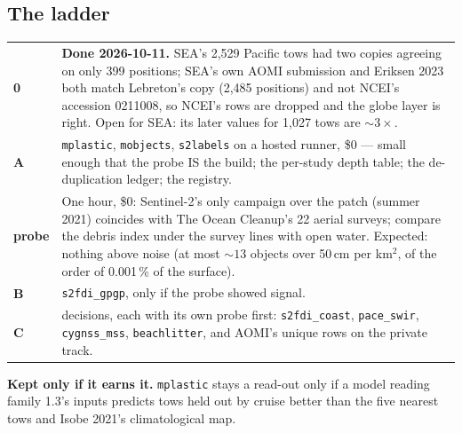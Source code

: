 \documentclass[10pt]{article}
\newcommand{\code}[1]{\texttt{#1}}
\begin{document}
\subsection*{The ladder}
\begin{tabular}{@{}L{1.2cm}L{16.3cm}@{}}
\textbf{0} & \textbf{Done 2026-10-11.} SEA's 2,529 Pacific tows had two copies agreeing on only 399 positions; SEA's
own AOMI submission and Eriksen 2023 both match Lebreton's copy (2,485 positions) and not NCEI's accession 0211008,
so NCEI's rows are dropped and the globe layer is right. Open for SEA: its later values for 1,027 tows are $\sim 3\times$. \\
\textbf{A} & \code{mplastic}, \code{mobjects}, \code{s2labels} on a hosted runner, \$0 --- small enough that the
probe IS the build; the per-study depth table; the de-duplication ledger; the registry. \\
\textbf{probe} & One hour, \$0: Sentinel-2's only campaign over the patch (summer 2021) coincides with The Ocean
Cleanup's 22 aerial surveys; compare the debris index under the survey lines with open water. Expected: nothing above
noise (at most $\sim 13$ objects over 50\,cm per km$^2$, of the order of 0.001\,\% of the surface). \\
\textbf{B} & \code{s2fdi\_gpgp}, only if the probe showed signal. \\
\textbf{C} & decisions, each with its own probe first: \code{s2fdi\_coast}, \code{pace\_swir}, \code{cygnss\_mss},
\code{beachlitter}, and AOMI's unique rows on the private track. \\
\end{tabular}

\textbf{Kept only if it earns it.} \code{mplastic} stays a read-out only if a model reading family 1.3's inputs
predicts tows held out by cruise better than the five nearest tows and Isobe 2021's climatological map.

\clearpage
{}\label{glossary}
\end{document}
